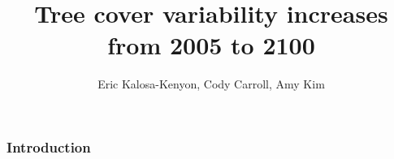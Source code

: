 \documentclass{beamer}
\title{Tree cover variability increases from 2005 to 2100}
\author{Eric Kalosa-Kenyon, Cody Carroll, Amy Kim}
\institute{University of California, Davis}
\date{}
\begin{document}
\frame{\titlepage}

\begin{frame}
    \frametitle{Introduction}
\end{frame}




\end{document}
